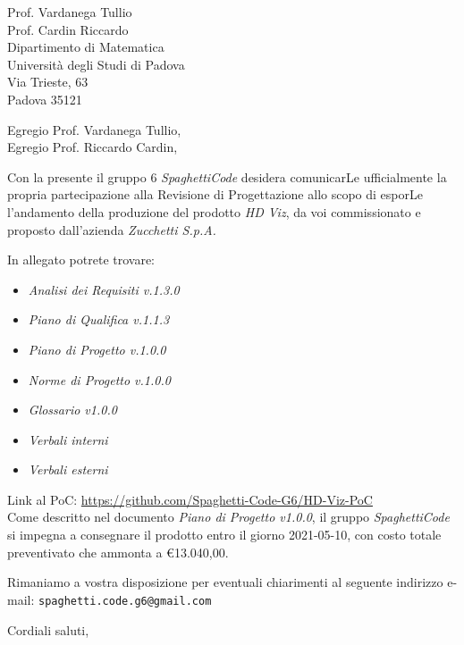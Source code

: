 \documentclass[a4paper,12pt]{letteracdp}
\date{10 marzo 2021}
\begin{document}
\begin{letter}{
		\vspace*{-2\baselineskip}
		Prof. Vardanega Tullio \\
		Prof. Cardin Riccardo \\
		Dipartimento di Matematica \\
		Università degli Studi di Padova \\
		Via Trieste, 63 \\
		Padova 35121}

	\opening{Egregio Prof. Vardanega Tullio, \\
	\noindent Egregio Prof. Riccardo Cardin,}

	\begin{flushleft}
		Con la presente il gruppo 6 \textit{SpaghettiCode} desidera comunicarLe ufficialmente la propria partecipazione alla Revisione di Progettazione allo scopo di esporLe l'andamento della produzione del prodotto 
        \textit{HD Viz}, da voi commissionato e proposto dall'azienda \textit{Zucchetti S.p.A.}
        
		In allegato potrete trovare:
	\end{flushleft}

	\begin{itemize}
		\item \emph{Analisi dei Requisiti v.1.3.0}
		\item \emph{Piano di Qualifica v.1.1.3}
		\item \emph{Piano di Progetto v.1.0.0}
		\item \emph{Norme di Progetto v.1.0.0}
		\item \emph{Glossario v1.0.0}
		\item \emph{Verbali interni}
		\item \emph{Verbali esterni}
	\end{itemize}
	
	\begin{flushleft}
		Link al PoC: \url{https://github.com/Spaghetti-Code-G6/HD-Viz-PoC} \\
		Come descritto nel documento \emph{Piano di Progetto v1.0.0}, il gruppo \textit{SpaghettiCode} si impegna a consegnare il prodotto entro il giorno 2021-05-10, con costo totale preventivato che ammonta a \euro{13.040,00}.

		Rimaniamo a vostra disposizione per eventuali chiarimenti al seguente indirizzo e-mail: {\texttt{spaghetti.code.g6@gmail.com}}
	\end{flushleft}

	\closing{Cordiali saluti,}

\end{letter}
\end{document}
